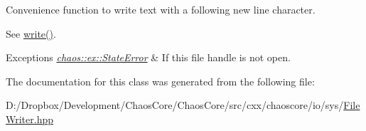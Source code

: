 Convenience function to write text with a following new line character. 

See \hyperlink{classchaos_1_1io_1_1sys_1_1_file_writer_adb940c8094f94604f78879b3901584d4}{write()}.


\begin{DoxyExceptions}{Exceptions}
{\em \hyperlink{classchaos_1_1ex_1_1_state_error}{chaos\+::ex\+::\+State\+Error}} & If this file handle is not open. \\
\hline
\end{DoxyExceptions}


The documentation for this class was generated from the following file\+:\begin{DoxyCompactItemize}
\item 
D\+:/\+Dropbox/\+Development/\+Chaos\+Core/\+Chaos\+Core/src/cxx/chaoscore/io/sys/\hyperlink{_file_writer_8hpp}{File\+Writer.\+hpp}\end{DoxyCompactItemize}

